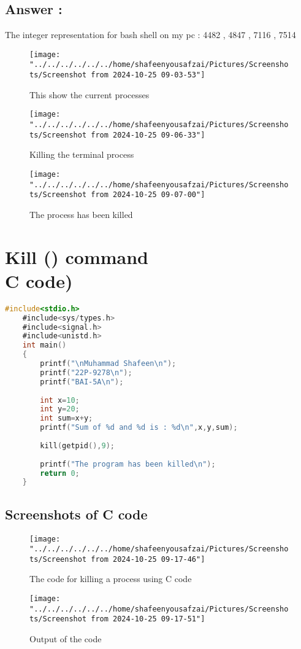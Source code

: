 \documentclass[12pt]{article}
\begin{document}
\subsection{Answer : }
The integer representation for bash shell on my pc : 4482 , 4847 , 7116 , 7514
	\begin{figure}[H]
		\centering
		\texttt{[image: "../../../../../../home/shafeenyousafzai/Pictures/Screenshots/Screenshot from 2024-10-25 09-03-53"]}
		\caption{This show the current processes}
		\label{fig:screenshot-from-2024-10-25-09-03-53}
	\end{figure}
	\begin{figure}[H]
		\centering
		\texttt{[image: "../../../../../../home/shafeenyousafzai/Pictures/Screenshots/Screenshot from 2024-10-25 09-06-33"]}
		\caption{Killing the terminal process}
		\label{fig:screenshot-from-2024-10-25-09-06-33}
	\end{figure}
	\begin{figure}[H]
		\centering
		\texttt{[image: "../../../../../../home/shafeenyousafzai/Pictures/Screenshots/Screenshot from 2024-10-25 09-07-00"]}
		\caption{The process has been killed}
		\label{fig:screenshot-from-2024-10-25-09-07-00}
	\end{figure}
\section{Kill () command\\ C code)}	
\begin{lstlisting}[language=C, caption={Mini-Shell using execvp}]
	#include<stdio.h>
	#include<sys/types.h>
	#include<signal.h>
	#include<unistd.h>
	int main()
	{
		printf("\nMuhammad Shafeen\n");
		printf("22P-9278\n");
		printf("BAI-5A\n");
		
		int x=10;
		int y=20;
		int sum=x+y;
		printf("Sum of %d and %d is : %d\n",x,y,sum);
		
		kill(getpid(),9);
		
		printf("The program has been killed\n");
		return 0;
	}	
\end{lstlisting}		
\subsection{Screenshots of C code}

\begin{figure}[H]
	\centering
	\texttt{[image: "../../../../../../home/shafeenyousafzai/Pictures/Screenshots/Screenshot from 2024-10-25 09-17-46"]}
	\caption{The code for killing a process using C code}
	\label{fig:screenshot-from-2024-10-25-09-17-46}
\end{figure}
\begin{figure}[H]
	\centering
	\texttt{[image: "../../../../../../home/shafeenyousafzai/Pictures/Screenshots/Screenshot from 2024-10-25 09-17-51"]}
	\caption{Output of the code}
	\label{fig:screenshot-from-2024-10-25-09-17-51}
\end{figure}
\end{document}
